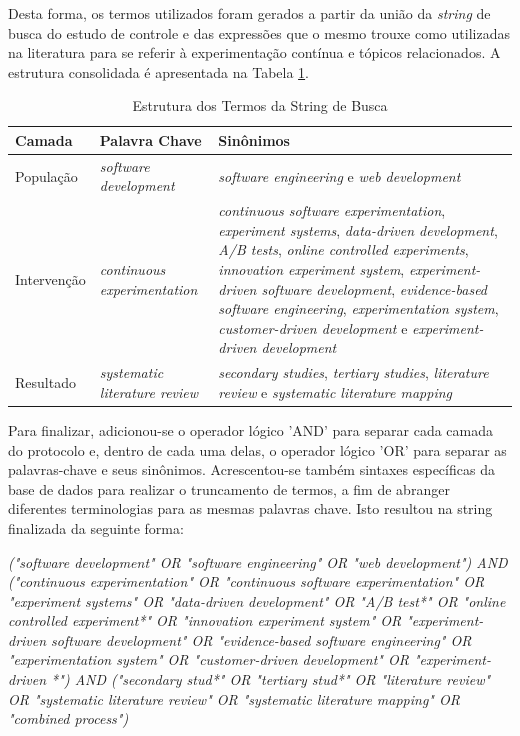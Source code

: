 Desta forma, os termos utilizados foram gerados a partir da união da \textit{string} de busca do estudo de controle e das expressões que o mesmo trouxe como utilizadas na literatura para se referir à experimentação contínua e tópicos relacionados. A estrutura consolidada é apresentada na Tabela \ref{tab:string-busca}.


\begin{table}[]
\caption{Estrutura dos Termos da String de Busca}
    \begin{tabular}{|p{2cm}|p{3cm}|p{9cm}|}
        \hline
        \textbf{Camada} & \textbf{Palavra Chave} & \textbf{Sinônimos} \\ \hline
        População & \textit{software development} & \textit{software engineering} 
         e \textit{web development} \\ \hline
        Intervenção & \textit{continuous experimentation} & \textit{continuous software experimentation}, \textit{experiment systems}, \textit{data-driven development}, \textit{A/B tests}, \textit{online controlled experiments}, \textit{innovation experiment system}, \textit{experiment-driven software development}, \textit{evidence-based software engineering}, \textit{experimentation system}, \textit{customer-driven development} e \textit{experiment-driven development} \\ \hline
        Resultado & \textit{systematic literature review} & \textit{secondary studies}, \textit{tertiary studies}, \textit{literature review} e \textit{systematic literature mapping} \\ \hline
    \end{tabular}

    \begin{center}
        
    \end{center}

\label{tab:string-busca}
\end{table}

Para finalizar, adicionou-se o operador lógico 'AND' para separar cada camada do protocolo e, dentro de cada uma delas, o operador lógico 'OR' para separar as palavras-chave e seus sinônimos. Acrescentou-se também sintaxes específicas da base de dados para realizar o truncamento de termos, a fim de abranger diferentes terminologias para as mesmas palavras chave. Isto resultou na string finalizada da seguinte forma:

\textit{("software development" OR "software engineering" OR "web development") 
AND 
("continuous experimentation" OR "continuous software experimentation" OR "experiment systems" OR "data-driven development" OR "A/B test*" OR "online controlled experiment*" OR "innovation experiment system" OR "experiment-driven software development" OR "evidence-based software engineering" OR "experimentation system" OR "customer-driven development" OR "experiment-driven *") 
AND 
("secondary stud*" OR "tertiary stud*" OR "literature review" OR "systematic literature review" OR "systematic literature mapping" OR "combined process") 
}
